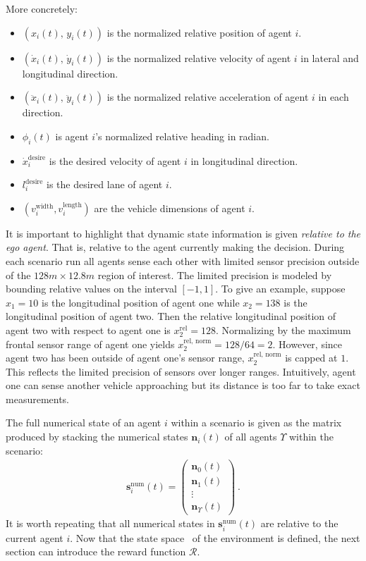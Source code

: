 More concretely:
\begin{itemize}
    \item $(x_i(t), \, y_i(t))$ is the normalized relative position of agent $i$.
    \item $(\dot x_i(t), \, \dot y_i(t))$ is the normalized relative velocity of agent $i$ in lateral and longitudinal direction.
    \item $(\ddot x_i (t), \, \ddot y_i (t))$ is the normalized relative acceleration of agent $i$ in each direction.
    \item $\phi_i (t)$ is agent $i$'s normalized relative heading in radian.
    \item $\dot x_i^{\text{desire}}$ is the desired velocity of agent $i$ in longitudinal direction.
    \item $l_i^{\text{desire}}$ is the desired lane of agent $i$.
    \item $(v_i^{\text{width}}, v_i^{\text{length}})$ are the vehicle dimensions of agent $i$.
\end{itemize}
It is important to highlight that dynamic state information is given \emph{relative to the ego agent}. That is, relative to the agent currently making the decision. During each scenario run all agents sense each other with limited sensor precision outside of the $128m \times 12.8m$ region of interest. The limited precision is modeled by bounding relative values on the interval $[-1, 1]$. To give an example, suppose $x_1=10$ is the longitudinal position of agent one while $x_2=138$ is the longitudinal position of agent two. Then the relative longitudinal position of agent two with respect to agent one is $x_2^{\text{rel}} = 128$. Normalizing by the maximum frontal sensor range of agent one yields $x_2^{\text{rel, norm}} = 128/64 = 2$. However, since agent two has been outside of agent one's sensor range, $x_2^{\text{rel, norm}}$ is capped at $1$. This reflects the limited precision of sensors over longer ranges. Intuitively, agent one can sense another vehicle approaching but its distance is too far to take exact measurements.

The full numerical state of an agent $i$ within a scenario is given as the matrix produced by stacking the numerical states $\mathbf n_i (t)$ of all agents $\Upsilon$ within the scenario:
\begin{gather}\label{eq:full_numerical_rep}
   \mathbf s_i^{\text{num}} (t) =  \begin{pmatrix}
    \mathbf n_0 (t)\\
    \mathbf n_1 (t)\\
    \vdots\\
    \mathbf n_\Upsilon (t)
    \end{pmatrix}~.
\end{gather}
It is worth repeating that all numerical states in $\mathbf s_i^{\text{num}} (t)$ are relative to the current agent $i$. Now that the state space \statespace\ of the environment is defined, the next section can introduce the reward function $\mathcal R$.

